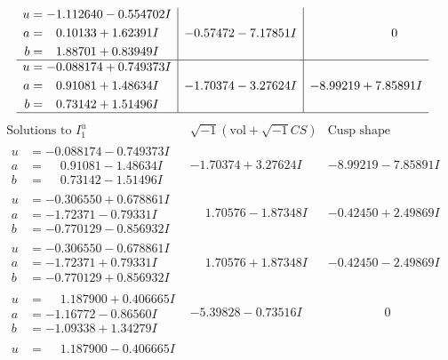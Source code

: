 \documentclass[1p]{elsarticle_modified}
\theoremstyle{definition}
\newcommand{\I}{\sqrt{-1}}
\begin{document}
$$\begin{array}{c|c|c}
\begin{aligned}
u &= -1.112640 - 0.554702 I \\
a &= \phantom{-}0.10133 + 1.62391 I \\
b &= \phantom{-}1.88701 + 0.83949 I\end{aligned}
 & -0.57472 - 7.17851 I & \phantom{-0.000000 } 0 \\ \hline\begin{aligned}
u &= -0.088174 + 0.749373 I \\
a &= \phantom{-}0.91081 + 1.48634 I \\
b &= \phantom{-}0.73142 + 1.51496 I\end{aligned}
 & -1.70374 - 3.27624 I & -8.99219 + 7.85891 I\\
 \hline 
 \end{array}$$\newpage$$\begin{array}{c|c|c}  
\text{Solutions to }I^u_{1}& \I (\text{vol} + \sqrt{-1}CS) & \text{Cusp shape}\\
 \hline 
\begin{aligned}
u &= -0.088174 - 0.749373 I \\
a &= \phantom{-}0.91081 - 1.48634 I \\
b &= \phantom{-}0.73142 - 1.51496 I\end{aligned}
 & -1.70374 + 3.27624 I & -8.99219 - 7.85891 I \\ \hline\begin{aligned}
u &= -0.306550 + 0.678861 I \\
a &= -1.72371 - 0.79331 I \\
b &= -0.770129 - 0.856932 I\end{aligned}
 & \phantom{-}1.70576 - 1.87348 I & -0.42450 + 2.49869 I \\ \hline\begin{aligned}
u &= -0.306550 - 0.678861 I \\
a &= -1.72371 + 0.79331 I \\
b &= -0.770129 + 0.856932 I\end{aligned}
 & \phantom{-}1.70576 + 1.87348 I & -0.42450 - 2.49869 I \\ \hline\begin{aligned}
u &= \phantom{-}1.187900 + 0.406665 I \\
a &= -1.16772 - 0.86560 I \\
b &= -1.09338 + 1.34279 I\end{aligned}
 & -5.39828 - 0.73516 I & \phantom{-0.000000 } 0 \\ \hline\begin{aligned}
u &= \phantom{-}1.187900 - 0.406665 I \\

\end{aligned}
\end{array}$$
\end{document}
